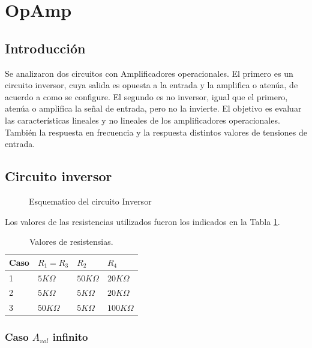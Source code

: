 \documentclass[../../main.tex]{subfiles}
\begin{document}
\section{OpAmp}
\subsection{Introducci\'on}
Se analizaron dos circuitos con Amplificadores operacionales. El primero es un circuito inversor, cuya salida es opuesta a la entrada y la amplifica o atenúa, de acuerdo a como se configure. El segundo es no inversor, igual que el primero, atenúa o amplifica la señal de entrada, pero no la invierte.
El objetivo es evaluar las características lineales y no lineales de los amplificadores operacionales. También la respuesta en frecuencia y la respuesta distintos valores de tensiones de entrada.



\subsection{Circuito inversor}



\begin{figure}[H]
\centering



\caption{Esquematico del circuito Inversor}
\end{figure}

Los valores de las resistencias utilizados fueron los indicados en la Tabla \ref{tab=vResistencias}.

\begin{table}[h]
\begin{center}
\begin{tabular}{|l|l|l|l|}
\hline
Caso & $R_{1}=R_{3}$ & $R_{2}$ & $R_{4}$\\
\hline \hline
1 & $5 K\Omega $ &  $50 K\Omega $ &  $20 K\Omega $ \\ \hline
2 & $5 K\Omega $ &  $5 K\Omega $ &  $20 K\Omega $ \\ \hline
3 & $50 K\Omega $ &  $5 K\Omega $ &  $100 K\Omega $ \\ \hline
\end{tabular}
\caption{Valores de resistensias.} 
\label{tab=vResistencias}
\end{center}
\end{table}



\subsubsection{Caso $A_{vol}$ infinito}
\end{document}
